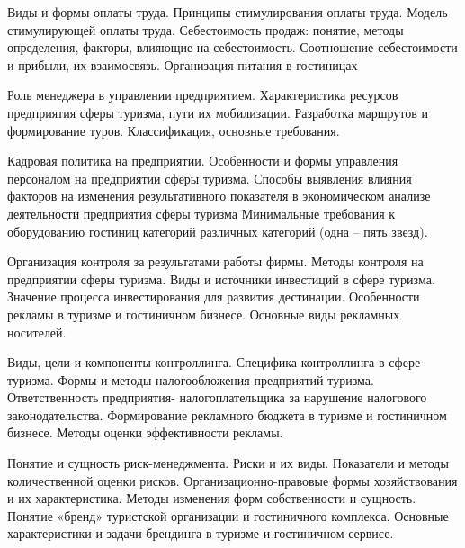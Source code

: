 \documentclass[
	11pt,
	a4paper,
	]
	{article}
\begin{document}
\bigskip

\noindent{} 
	{
		Виды и формы оплаты труда. Принципы стимулирования оплаты труда. Модель стимулирующей оплаты труда.
	}{
		Себестоимость продаж: понятие, методы определения, факторы, влияющие на себестоимость. Соотношение себестоимости и прибыли, их взаимосвязь.
	}{
		Организация питания в гостиницах
	}

\bigskip

\noindent{} 
	{
		Роль менеджера в управлении предприятием.
	}{
		Характеристика ресурсов предприятия сферы туризма, пути их мобилизации.
	}{
		Разработка маршрутов и формирование туров. Классификация, основные требования.
	}

\bigskip

\noindent{} 
	{
		Кадровая политика на предприятии. Особенности и формы управления персоналом на предприятии сферы туризма.
	}{
		Способы выявления влияния факторов на изменения результативного показателя в экономическом анализе деятельности предприятия сферы туризма
	}{
		Минимальные требования к оборудованию гостиниц категорий различных категорий (одна – пять звезд).
	}

\bigskip

\noindent{} 
	{
		Организация контроля за результатами работы фирмы. Методы контроля на предприятии сферы туризма.
	}{
		Виды и источники инвестиций в сфере туризма. Значение процесса инвестирования для развития дестинации.
	}{
		Особенности рекламы в туризме и гостиничном бизнесе. Основные виды рекламных носителей.
	}

\bigskip

\noindent{} 
	{
		Виды, цели и компоненты контроллинга. Специфика контроллинга в сфере туризма.
	}{
		Формы и методы налогообложения предприятий туризма. Ответственность предприятия- налогоплательщика за нарушение налогового законодательства.
	}{
		Формирование рекламного бюджета в туризме и гостиничном бизнесе. Методы оценки эффективности рекламы.
	}

\bigskip

\noindent{} 
	{
		Понятие и сущность риск-менеджмента. Риски и их виды. Показатели и методы количественной оценки рисков.
	}{
		Организационно-правовые формы хозяйствования и их характеристика. Методы изменения форм собственности и сущность.
	}{
		Понятие «бренд» туристской организации и гостиничного комплекса. Основные характеристики и задачи брендинга в туризме и гостиничном сервисе.
	}

\bigskip
\end{document}
